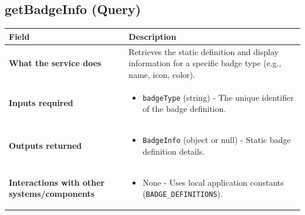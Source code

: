 \documentclass[11pt,a4paper]{article}
\begin{document}
\subsection{getBadgeInfo (Query)}
\label{sub:getBadgeInfo}
\begin{longtable}{|p{4cm}|p{12cm}|}
\hline
\textbf{Field} & \textbf{Description} \\
\hline
\textbf{What the service does} & 
Retrieves the static definition and display information for a specific badge type (e.g., name, icon, color). \\
\hline
\textbf{Inputs required} & 
\begin{itemize}[nosep]
\item \texttt{badgeType} (string) - The unique identifier of the badge definition.
\end{itemize} \\
\hline
\textbf{Outputs returned} & 
\begin{itemize}[nosep]
\item \texttt{BadgeInfo} (object or null) - Static badge definition details.
\end{itemize} \\
\hline
\textbf{Interactions with other systems/components} & 
\begin{itemize}[nosep]
\item None - Uses local application constants (\texttt{BADGE\_DEFINITIONS}).
\end{itemize} \\
\hline
\end{longtable}
\end{document}
